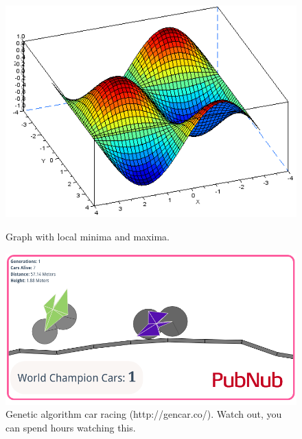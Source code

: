 \documentclass[11pt]{article}
\begin{document}
\begin{figure}
  \centering
  \includegraphics{pics/plot3d}
  \label{fig:siman}
  \caption{Graph with local minima and maxima.}
\end{figure}

\begin{algorithm}[h]
\begin{algorithmic}[1]
    
  \EndIf{}
  \EndProcedure{}
\end{algorithmic}

\end{algorithm}




\begin{figure}
  \centering
  \includegraphics[width=\textwidth]{pics/genetic}
  \caption{Genetic algorithm car racing  (http://gencar.co/). Watch out, you can spend hours watching this. }
\end{figure}

\end{document}

